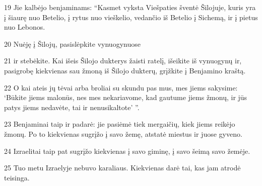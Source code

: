 \par 19 Jie kalbėjo benjaminams: “Kasmet vyksta Viešpaties šventė Šilojuje, kuris yra į šiaurę nuo Betelio, į rytus nuo vieškelio, vedančio iš Betelio į Sichemą, ir į pietus nuo Lebonos. 
\par 20 Nuėję į Šilojų, pasislėpkite vynuogynuose 
\par 21 ir stebėkite. Kai išeis Šilojo dukterys žaisti ratelį, išeikite iš vynuogynų ir, pasigrobę kiekvienas sau žmoną iš Šilojo dukterų, grįžkite į Benjamino kraštą. 
\par 22 O kai ateis jų tėvai arba broliai su skundu pas mus, mes jiems sakysime: ‘Būkite jiems malonūs, nes mes nekariavome, kad gautume jiems žmonų, ir jūs patys jiems nedavėte, tai ir nenusikaltote’ ”. 
\par 23 Benjaminai taip ir padarė: jie pasiėmė tiek mergaičių, kiek jiems reikėjo žmonų. Po to kiekvienas sugrįžo į savo žemę, atstatė miestus ir juose gyveno. 
\par 24 Izraelitai taip pat sugrįžo kiekvienas į savo giminę, į savo šeimą savo žemėje. 
\par 25 Tuo metu Izraelyje nebuvo karaliaus. Kiekvienas darė tai, kas jam atrodė teisinga.



